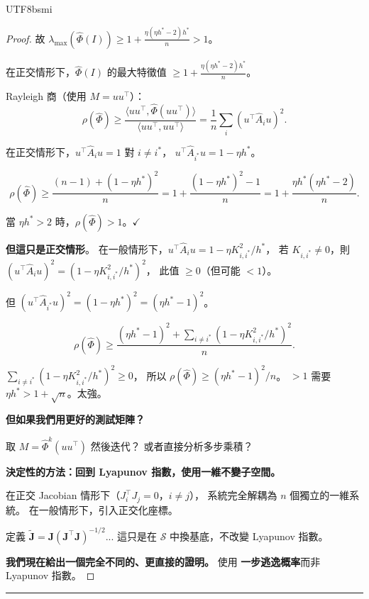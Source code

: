 \documentclass[11pt,a4paper]{article}
\theoremstyle{definition}
\newcommand{\cS}{\mathcal{S}}
\newcommand{\bJ}{\mathbf{J}}
\begin{document}
\begin{CJK}{UTF8}{bsmi}
\begin{proof}
  故 $\lambda_{\max}(\hat\Phi(I)) \geq 1 + \frac{\eta(\eta h^* - 2)h^*}{n} > 1$。

  在正交情形下，$\hat\Phi(I)$ 的最大特徵值 $\geq 1 + \frac{\eta(\eta h^* - 2)h^*}{n}$。

  Rayleigh 商（使用 $M = uu^\top$）：
  \[
    \rho(\hat\Phi) \geq \frac{\langle uu^\top, \hat\Phi(uu^\top)\rangle}{\langle uu^\top, uu^\top\rangle}
    = \frac{1}{n}\sum_i(u^\top\hat{A}_i u)^2.
  \]

  在正交情形下，$u^\top\hat{A}_i u = 1$ 對 $i \neq i^*$，
  $u^\top\hat{A}_{i^*}u = 1 - \eta h^*$。

  \[
    \rho(\hat\Phi) \geq \frac{(n-1) + (1-\eta h^*)^2}{n}
    = 1 + \frac{(1-\eta h^*)^2 - 1}{n}
    = 1 + \frac{\eta h^*(\eta h^* - 2)}{n}.
  \]

  當 $\eta h^* > 2$ 時，$\rho(\hat\Phi) > 1$。$\checkmark$

  \textbf{但這只是正交情形}。
  在一般情形下，$u^\top\hat{A}_i u = 1 - \eta K_{i,i^*}^2/h^*$，
  若 $K_{i,i^*} \neq 0$，則 $(u^\top\hat{A}_i u)^2 = (1 - \eta K_{i,i^*}^2/h^*)^2$，
  此值 $\geq 0$（但可能 $< 1$）。

  但 $(u^\top\hat{A}_{i^*}u)^2 = (1 - \eta h^*)^2 = (\eta h^* - 1)^2$。

  \[
    \rho(\hat\Phi) \geq \frac{(\eta h^* - 1)^2 + \sum_{i\neq i^*}(1-\eta K_{i,i^*}^2/h^*)^2}{n}.
  \]

  $\sum_{i\neq i^*}(1-\eta K_{i,i^*}^2/h^*)^2 \geq 0$，
  所以 $\rho(\hat\Phi) \geq (\eta h^* - 1)^2/n$。
  $> 1$ 需要 $\eta h^* > 1 + \sqrt{n}$。太強。

  \textbf{但如果我們用更好的測試矩陣？}

  取 $M = \hat\Phi^{k}(uu^\top)$ 然後迭代？
  或者直接分析多步乘積？

  \medskip
  \textbf{決定性的方法：回到 Lyapunov 指數，使用一維不變子空間。}

  在正交 Jacobian 情形下（$J_i^\top J_j = 0$，$i \neq j$），
  系統完全解耦為 $n$ 個獨立的一維系統。
  在一般情形下，引入正交化座標。

  定義 $\tilde{\bJ} = \bJ(\bJ^\top\bJ)^{-1/2}$...
  這只是在 $\cS$ 中換基底，不改變 Lyapunov 指數。

  \medskip
  \textbf{我們現在給出一個完全不同的、更直接的證明。}
  使用 \textbf{一步逃逸概率}而非 Lyapunov 指數。
\end{proof}

\bigskip
\hrule
\bigskip



\end{CJK}
\end{document}
